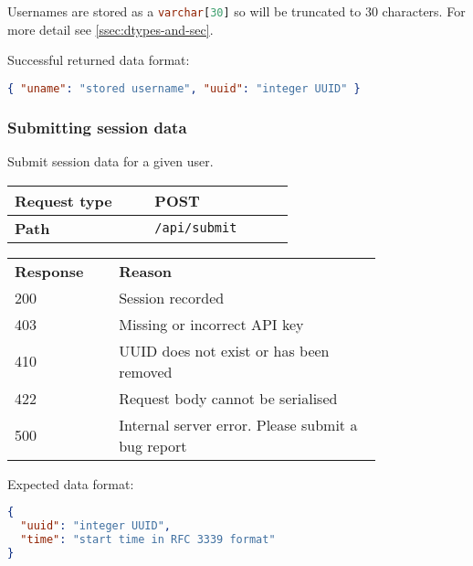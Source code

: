 \documentclass{../../Reports/custom}
\begin{document}
Usernames are stored as a \lstinline[language=sql]{varchar[30]} so will be truncated to 30 characters. For more detail see \cref{ssec:dtypes-and-sec}.

Successful returned data format:

\begin{lstlisting}[language=json]
{ "uname": "stored username", "uuid": "integer UUID" }
\end{lstlisting}

\subsubsection{Submitting session data}

Submit session data for a given user.

\begin{multicols}{2}

\begin{center}
	\begin{tabular}{|p{0.4\linewidth}|p{0.4\linewidth}|}
	\hline
		\textbf{Request type} & POST \\\hline
		\textbf{Path} & \texttt{/api/submit} \\\hline
	\end{tabular}
\end{center}
\columnbreak

\begin{center}
	\begin{tabular}{|p{0.225\linewidth}|p{0.575\linewidth}|}
	\hline
		\textbf{Response} & \textbf{Reason} \\\Xhline{3\arrayrulewidth}
		200 & Session recorded \\\hline
		403 & Missing or incorrect API key \\\hline
		410 & UUID does not exist or has been removed \\\hline
		422 & Request body cannot be serialised \\\hline
		500 & Internal server error. Please submit a bug report \\\hline
	\end{tabular}
\end{center}
	
\end{multicols}

Expected data format: %

\begin{lstlisting}[language=json]
{
  "uuid": "integer UUID",
  "time": "start time in RFC 3339 format"
}
\end{lstlisting}
\end{document}
